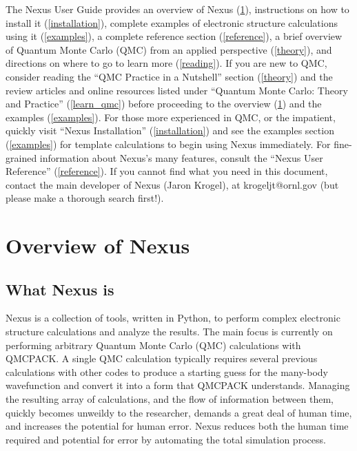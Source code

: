 \documentclass[oneside,11pt]{memoir}
\numberwithin{equation}{section}
\begin{document}
The Nexus User Guide provides an overview of Nexus 
(\ref{overview}), instructions on how to install it (\ref{installation}), 
complete examples of electronic structure calculations using it 
(\ref{examples}), a complete reference section (\ref{reference}), 
a brief overview of Quantum Monte Carlo (QMC) from an applied perspective 
(\ref{theory}), and directions on where to go to learn more (\ref{reading}).  
If you are new to QMC, consider reading the
 ``QMC Practice in a Nutshell'' section (\ref{theory}) and the 
review articles and online resources listed under
 ``Quantum Monte Carlo: Theory and Practice'' (\ref{learn_qmc}) 
before proceeding to the overview (\ref{overview}) and the examples 
(\ref{examples}).  For those more experienced in QMC, or the impatient, 
quickly visit ``Nexus Installation'' (\ref{installation}) and see the 
examples section (\ref{examples}) for template calculations to begin 
using Nexus immediately.  For fine-grained information 
about Nexus's many features, consult 
the ``Nexus User Reference'' (\ref{reference}).
If you cannot find what you need in this document, contact the main 
developer of Nexus (Jaron Krogel), at krogeljt@ornl.gov 
(but please make a thorough search first!).



\pagebreak
\chapter{Overview of Nexus} \label{overview}
\section{What Nexus is}
Nexus is a collection of tools, written in Python, to perform 
complex electronic structure calculations and analyze the results.  The main 
focus is currently on performing arbitrary Quantum Monte Carlo (QMC) 
calculations with QMCPACK.  A single QMC calculation typically requires several 
previous calculations with other codes to produce a starting guess for the 
many-body wavefunction and convert it into a form that QMCPACK understands.  
Managing the resulting array of calculations, and the flow of information 
between them, quickly becomes unweildy to the researcher, demands a great 
deal of human time, and increases the potential for human error.  Nexus 
reduces both the human time required and potential for error by 
automating the total simulation process.  
\end{document}
